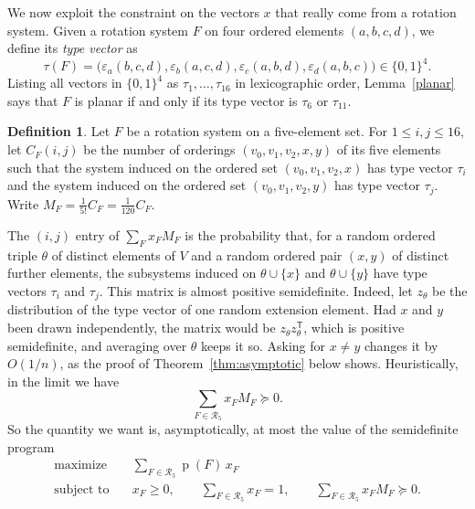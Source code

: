 \documentclass{article}
\theoremstyle{plain}
\theoremstyle{definition}
\newtheorem{definition}[theorem]{Definition}
\theoremstyle{remark}
\newcommand{\p}{\operatorname{p}}
\begin{document}
We now exploit the constraint on the vectors \(x\) that really come
from a rotation system.  Given a rotation system \(F\) on four
ordered elements \((a,b,c,d)\), we define its \emph{type vector} as
\[
\tau(F)=\bigl(\varepsilon_a(b,c,d),\varepsilon_b(a,c,d),
\varepsilon_c(a,b,d),\varepsilon_d(a,b,c)\bigr)\in\{0,1\}^4 .
\]
Listing all vectors in \(\{0,1\}^4\) as \(\tau_1,\ldots,\tau_{16}\) in
lexicographic order, Lemma~\ref{planar} says that \(F\) is planar if
and only if its type vector is \(\tau_6\) or \(\tau_{11}\).

\begin{definition}\label{def:five-vertex-flag-matrix}
Let \(F\) be a rotation system on a five-element set.  For
\(1\leq i,j\leq16\), let \(C_F(i,j)\) be the number of orderings
\((v_0,v_1,v_2,x,y)\) of its five elements such that the system
induced on the ordered set \((v_0,v_1,v_2,x)\) has type vector
\(\tau_i\) and the system induced on the ordered set
\((v_0,v_1,v_2,y)\) has type vector \(\tau_j\).  Write
\(M_F=\frac{1}{5!}C_F=\frac{1}{120}C_F\).
\end{definition}

The \((i,j)\) entry of \(\sum_Fx_FM_F\) is the probability that, for a
random ordered triple \(\theta\) of distinct elements of \(V\) and a
random ordered pair \((x,y)\) of distinct further elements, the
subsystems induced on \(\theta\cup\{x\}\) and \(\theta\cup\{y\}\) have
type vectors \(\tau_i\) and \(\tau_j\).  This matrix is almost
positive semidefinite.  Indeed, let \(z_\theta\) be the distribution
of the type vector of one random extension element.  Had \(x\) and
\(y\) been drawn independently, the matrix would be
\(z_\theta z_\theta^{\mathsf T}\), which is positive semidefinite, and
averaging over \(\theta\) keeps it so.  Asking for \(x\neq y\) changes
it by \(O(1/n)\), as the proof of Theorem~\ref{thm:asymptotic} below
shows.  Heuristically, in the limit we have
\begin{equation}\label{eq:psd-constraint}
\sum_{F\in\mathcal R_5}x_FM_F\succeq0 .
\end{equation}
So the quantity we want is, asymptotically, at most the value of the
semidefinite program
\begin{equation}\label{eq:sdp-primal}
\begin{aligned}
\text{maximize}\quad & \sum_{F\in\mathcal R_5}\p(F)\,x_F\\
\text{subject to}\quad & x_F\geq0,\qquad
\sum_{F\in\mathcal R_5}x_F=1,\qquad
\sum_{F\in\mathcal R_5}x_FM_F\succeq0 .
\end{aligned}
\end{equation}
\end{document}
